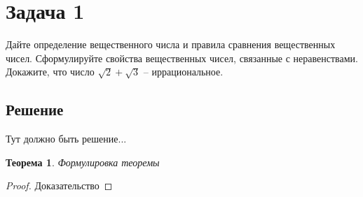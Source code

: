 \documentclass[a4paper,12pt]{article}
\newtheorem*{ther}{Теорема}
\begin{document}
	\section*{Задача 1}
	
	Дайте определение вещественного числа и правила сравнения вещественных чисел. Сформулируйте свойства вещественных чисел, связанные с неравенствами. Докажите, что число $\sqrt{2} + \sqrt{3}$ -- иррациональное.
	
	
	\subsection*{Решение}
	
	Тут должно быть решение...
	
	\begin{ther}
	Формулировка теоремы	
	\end{ther}
	
	\begin{proof}
		Доказательство
	\end{proof}
	
	
	
	
	
	
\end{document}
